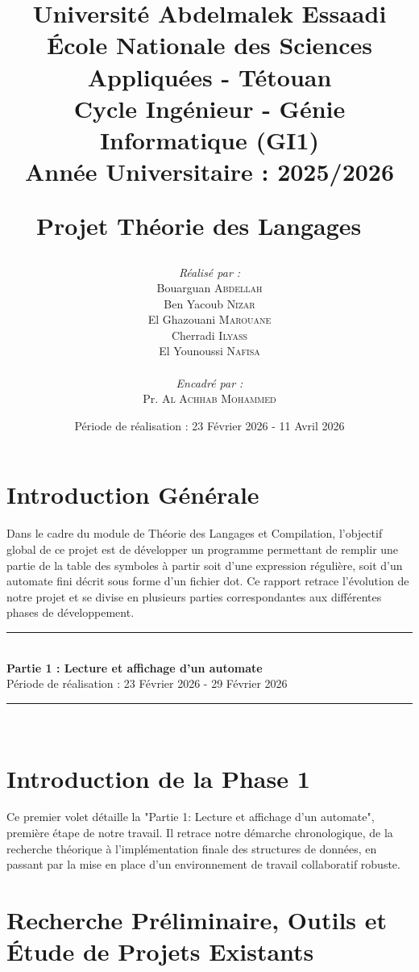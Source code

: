 \documentclass[12pt,a4paper]{article}
\title{
\vspace{-2cm}
\begin{center}
\large Université Abdelmalek Essaadi \\
\large École Nationale des Sciences Appliquées - Tétouan \\
\vspace{0.5cm}
\textbf{Cycle Ingénieur - Génie Informatique (GI1)} \\
\textbf{Année Universitaire : 2025/2026}
\end{center}
\vspace{2cm}
\HRule \
\textbf{\huge Projet Théorie des Langages} \
\HRule \
\vspace{2cm}
}
\author{
\begin{minipage}[t]{0.45\textwidth}
\begin{flushleft} \large
\emph{Réalisé par :}\\
Bouarguan \textsc{Abdellah} \\  
Ben Yacoub \textsc{Nizar} \\
El Ghazouani \textsc{Marouane} \\
Cherradi \textsc{Ilyass} \\
El Younoussi \textsc{Nafisa}
\end{flushleft}
\end{minipage}
~
\begin{minipage}[t]{0.45\textwidth}
\begin{flushright} \large
\emph{Encadré par :} \\
Pr. \textsc{Al Achhab Mohammed}
\end{flushright}
\end{minipage}
}
\date{Période de réalisation : 23 Février 2026 - 11 Avril 2026}
\newcommand{\HRule}{\rule{\linewidth}{0.5mm}}
\begin{document}
\maketitle
\thispagestyle{empty}
\newpage

\renewcommand{\contentsname}{\Huge Sommaire \vspace{1cm}}
\tableofcontents
\newpage

\section{Introduction Générale}
Dans le cadre du module de Théorie des Langages et Compilation, l'objectif global de ce projet est de développer un programme permettant de remplir une partie de la table des symboles à partir soit d'une expression régulière, soit d'un automate fini décrit sous forme d'un fichier dot. Ce rapport retrace l'évolution de notre projet et se divise en plusieurs parties correspondantes aux différentes phases de développement.

\newpage
\begin{center}
\vspace*{1cm}
\HRule \\[0.5cm]
\textbf{\huge Partie 1 : Lecture et affichage d'un automate} \\[0.5cm]
\Large Période de réalisation : 23 Février 2026 - 29 Février 2026 \\
\HRule \\
\vspace*{1cm}
\end{center}

\section{Introduction de la Phase 1}
Ce premier volet détaille la "Partie 1: Lecture et affichage d'un automate", première étape de notre travail. Il retrace notre démarche chronologique, de la recherche théorique à l'implémentation finale des structures de données, en passant par la mise en place d'un environnement de travail collaboratif robuste.

\section{Recherche Préliminaire, Outils et Étude de Projets Existants}
\end{document}
